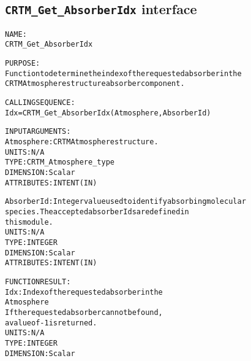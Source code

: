 \subsection{\texttt{CRTM\_Get\_AbsorberIdx} interface}
  \label{sec:CRTM_Get_AbsorberIdx_interface}
  \begin{alltt}
 
  NAME:
        CRTM_Get_AbsorberIdx
  
  PURPOSE:
        Function to determine the index of the requested absorber in the
        CRTM Atmosphere structure absorber component.
 
  CALLING SEQUENCE:
        Idx = CRTM_Get_AbsorberIdx(Atmosphere, AbsorberId)
 
  INPUT ARGUMENTS:
        Atmosphere:   CRTM Atmosphere structure.
                      UNITS:      N/A
                      TYPE:       CRTM_Atmosphere_type
                      DIMENSION:  Scalar
                      ATTRIBUTES: INTENT(IN)
 
        AbsorberId:   Integer value used to identify absorbing molecular
                      species. The accepted absorber Ids are defined in
                      this module.
                      UNITS:      N/A
                      TYPE:       INTEGER
                      DIMENSION:  Scalar
                      ATTRIBUTES: INTENT(IN)
 
  FUNCTION RESULT:
        Idx:          Index of the requested absorber in the 
                      Atmosphere%Absorber array component.
                      If the requested absorber cannot be found, 
                      a value of -1 is returned.
                      UNITS:      N/A
                      TYPE:       INTEGER
                      DIMENSION:  Scalar
 
  \end{alltt}

